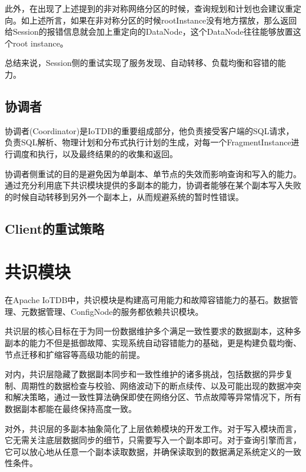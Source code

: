 此外，在出现了上述提到的非对称网络分区的时候，查询规划和计划也会建议重定向。如上述所言，如果在非对称分区的时候rootInstance没有地方摆放，那么返回给Session的报错信息就会加上重定向的DataNode，这个DataNode往往能够放置这个root instance。


总结来说，Session侧的重试实现了服务发现、自动转移、负载均衡和容错的能力。



\subsection{协调者}

协调者(Coordinator)是IoTDB的重要组成部分，他负责接受客户端的SQL请求，负责SQL解析、物理计划和分布式执行计划的生成，对每一个FragmentInstance进行调度和执行，以及最终结果的的收集和返回。

协调者侧重试的目的是避免因为单副本、单节点的失效而影响查询和写入的能力。通过充分利用底下共识模块提供的多副本的能力，协调者能够在某个副本写入失败的时候自动转移到另外一个副本上，从而规避系统的暂时性错误。






\subsection{Client的重试策略}




\section{共识模块}


在Apache IoTDB中，共识模块是构建高可用能力和故障容错能力的基石。数据管理、元数据管理、ConfigNode的服务都依赖共识模块。

共识层的核心目标在于为同一份数据维护多个满足一致性要求的数据副本，这种多副本的能力不但是抵御故障、实现系统自动容错能力的基础，更是构建负载均衡、节点迁移和扩缩容等高级功能的前提。

对内，共识层隐藏了数据副本同步和一致性维护的诸多挑战，包括数据的异步复制、周期性的数据检查与校验、网络波动下的断点续传、以及可能出现的数据冲突和解决策略，通过一致性算法确保即使在网络分区、节点故障等异常情况下，所有数据副本都能在最终保持高度一致。

对外，共识层的多副本抽象简化了上层依赖模块的开发工作。对于写入模块而言，它无需关注底层数据同步的细节，只需要写入一个副本即可。对于查询引擎而言，它可以放心地从任意一个副本读取数据，并确保读取到的数据满足系统定义的一致性条件。



